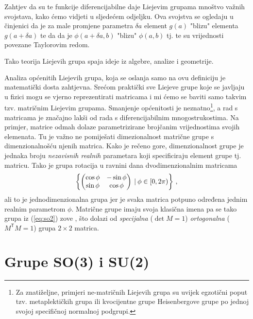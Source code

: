 Zahtjev da su te funkcije diferencijabilne daje Liejevim grupama mnoštvo važnih svojstava,
kako ćemo vidjeti u sljedećem odjeljku.
Ova svojstva se ogledaju
u činjenici da je za male promjene parametra $\delta a$
element $g(a)$ "blizu" elementa $g(a+\delta a)$ te da
da je $\phi(a+\delta a, b)$
"blizu" $\phi(a,b)$ tj. te su vrijednosti povezane Taylorovim redom.\\
\centerline{}
Tako teorija Liejevih grupa spaja ideje iz algebre, analize i geometrije.

Analiza općenitih Liejevih grupa, koja se oslanja samo na ovu definiciju
je matematički dosta zahtjevna. Srećom praktički sve Liejeve grupe koje se javljaju
u fizici mogu se vjerno reprezentirati matricama i mi ćemo se baviti
samo takvim tzv. matričnim Liejevim grupama. Smanjenje općenitosti je neznatno\footnote{Za
    znatiželjne, primjeri ne-matričnih Liejevih grupa su uvijek egzotični
    poput tzv. metaplektičkih grupa ili kvocijentne grupe Heisenbergove grupe po
jednoj svojoj specifičnoj normalnoj podgrupi.\label{fus:nematricne}},
a rad s matricama je značajno lakši od rada s diferencijabilnim mnogostrukostima.
Na primjer, matrice odmah dolaze parametrizirane brojčanim vrijednostima svojih
elemenata. Tu je važno
ne pomiješati dimezionalnost matrične grupe s dimenzionalnošću njenih matrica.
Kako je rečeno gore, dimenzionalnost grupe je jednaka broju \emph{nezavisnih realnih}
parametara koji specificiraju element grupe tj. matricu. Tako je grupa rotacija
u ravnini dana dvodimenzionalnim matricama
\begin{equation}
    \left\{ \begin{pmatrix}
        \cos\phi & -\sin\phi \\
        \sin\phi & \cos\phi 
    \end{pmatrix} 
     \: | \: \phi \in [0, 2\pi) \right\} \,,
    \label{eq:so2}
\end{equation}
ali to je jednodimenzionalna grupa jer je svaka matrica potpuno određena
jednim realnim parametrom $\phi$. Matrične grupe imaju svoja klasična
imena pa se tako grupa iz (\ref{eq:so2}) zove , što dolazi
od \emph{specijalna} ($\det M = 1$) 
\emph{ortogonalna} ($M^\mathsf{T} M = 1$) grupa $2\times 2$ matrica. 

\section{Grupe SO(3) i SU(2)}
\label{sec:so3su2}

